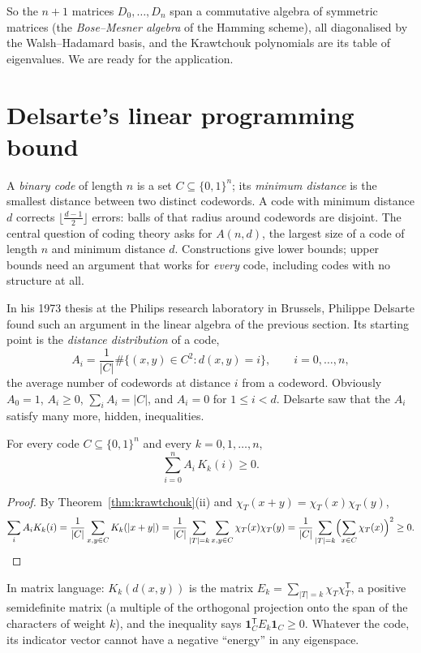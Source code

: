 So the $n+1$ matrices $D_0,\dots,D_n$ span a commutative algebra of symmetric matrices (the \emph{Bose--Mesner algebra} of the
Hamming scheme), all diagonalised by the Walsh--Hadamard basis, and the Krawtchouk polynomials are its table of eigenvalues. We
are ready for the application.

\section{Delsarte's linear programming bound}

A \emph{binary code} of length $n$ is a set $C\subseteq\{0,1\}^n$; its \emph{minimum distance} is the smallest distance between two
distinct codewords. A code with minimum distance $d$ corrects $\lfloor\frac{d-1}2\rfloor$ errors: balls of that radius around
codewords are disjoint. The central question of coding theory asks for $A(n,d)$, the largest size of a code of length $n$ and
minimum distance $d$. Constructions give lower bounds; upper bounds need an argument that works for \emph{every} code, including
codes with no structure at all.

In his 1973 thesis at the Philips research laboratory in Brussels, Philippe Delsarte found such an argument in the linear
algebra of the previous section. Its starting point is the \emph{distance distribution} of a code,
\[
A_i=\frac1{|C|}\#\{(x,y)\in C^2:d(x,y)=i\},\qquad i=0,\dots,n,
\]
the average number of codewords at distance $i$ from a codeword. Obviously $A_0=1$, $A_i\ge0$, $\sum_iA_i=|C|$, and $A_i=0$ for
$1\le i<d$. Delsarte saw that the $A_i$ satisfy many more, hidden, inequalities.

\begin{theorem}[Delsarte, 1973]\label{thm:delsarte}
For every code $C\subseteq\{0,1\}^n$ and every $k=0,1,\dots,n$,
\[
\sum_{i=0}^nA_i\,K_k(i)\ge0.
\]
\end{theorem}
\begin{proof}
By Theorem~\ref{thm:krawtchouk}(ii) and $\chi_T(x+y)=\chi_T(x)\chi_T(y)$,
\[
\sum_iA_iK_k(i)=\frac1{|C|}\sum_{x,y\in C}K_k(|x+y|)=\frac1{|C|}\sum_{|T|=k}\sum_{x,y\in C}\chi_T(x)\chi_T(y)
=\frac1{|C|}\sum_{|T|=k}\Bigl(\sum_{x\in C}\chi_T(x)\Bigr)^2\ge0.
\]
\end{proof}

In matrix language: $K_k(d(x,y))$ is the matrix $E_k=\sum_{|T|=k}\chi_T\chi_T^{\mathsf T}$, a positive semidefinite matrix (a multiple of
the orthogonal projection onto the span of the characters of weight $k$), and the inequality says $\mathbf 1_C^{\mathsf T}E_k\mathbf
1_C\ge0$. Whatever the code, its indicator vector cannot have a negative ``energy'' in any eigenspace.

